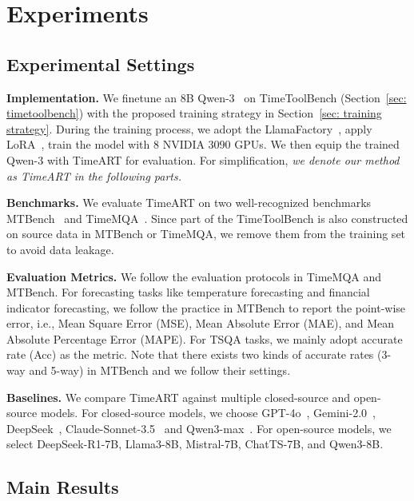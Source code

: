 \section{Experiments}
\subsection{Experimental Settings}
\textbf{Implementation.} We finetune an 8B Qwen-3~\citep{yang2025qwen3} on TimeToolBench (Section~\ref{sec: timetoolbench}) with the proposed training strategy in Section~\ref{sec: training strategy}. During the training process, we adopt the LlamaFactory~\citep{zheng2024llamafactoryunifiedefficientfinetuning}, apply LoRA~\citep{hulora}, train the model with 8 NVIDIA 3090 GPUs. We then equip the trained Qwen-3 with TimeART for evaluation. For simplification, \textit{we denote our method as TimeART in the following parts.}

\textbf{Benchmarks.} We evaluate TimeART on two well-recognized benchmarks MTBench~\citep{chen2025mtbench} and TimeMQA~\citep{TimeMQA}. Since part of the TimeToolBench is also constructed on source data in MTBench or TimeMQA, we remove them from the training set to avoid data leakage. 

\textbf{Evaluation Metrics.} We follow the evaluation protocols in TimeMQA and MTBench. For forecasting tasks like temperature forecasting and financial indicator forecasting, we follow the practice in MTBench to report the point-wise error, i.e., Mean Square Error (MSE), Mean Absolute Error (MAE), and Mean Absolute Percentage Error (MAPE). For TSQA tasks, we mainly adopt accurate rate (Acc) as the metric. Note that there exists two kinds of accurate rates (3-way and 5-way) in MTBench and we follow their settings.

\textbf{Baselines.} We compare TimeART against multiple closed-source and open-source models. For closed-source models, we choose GPT-4o~\citep{hurst2024gpt}, Gemini-2.0~\citep{team2023gemini}, DeepSeek~\citep{liu2024deepseek}, Claude-Sonnet-3.5~\citep{TheC3} and Qwen3-max~\citep{yang2025qwen3}. For open-source models, we select DeepSeek-R1-7B, Llama3-8B, Mistral-7B, ChatTS-7B, and Qwen3-8B. 

\subsection{Main Results}



